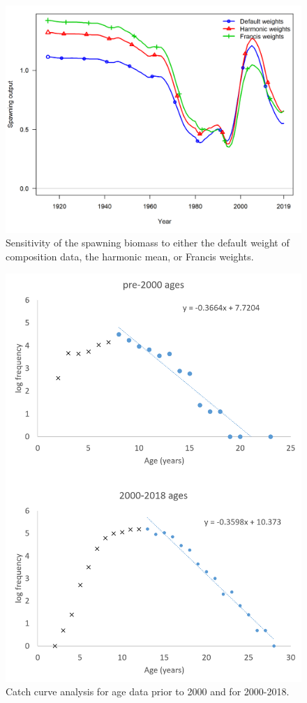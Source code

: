 \documentclass[12pt,]{article}
\begin{document}
\begin{figure}
\centering
\includegraphics{Figures/sensitivity2_spawnbio.png}
\caption{Sensitivity of the spawning biomass to either the default
weight of composition data, the harmonic mean, or Francis weights.
\label{fig:sensitivity2_spawnbio}}
\end{figure}

\FloatBarrier

\begin{figure}
\centering
\includegraphics{Figures/STAR_request1.png}
\caption{Catch curve analysis for age data prior to 2000 and for
2000-2018. \label{fig:STAR_request1}}
\end{figure}
\end{document}
